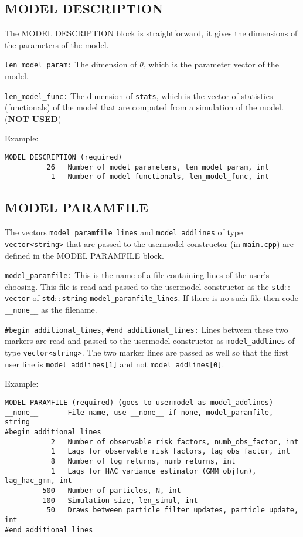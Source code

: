 \documentclass[11pt, letterpaper, notitlepage]{article}
\begin{document}
\subsection{MODEL DESCRIPTION}

The MODEL DESCRIPTION block is straightforward, it gives the dimensions of the parameters of the model.

\texttt{len\_model\_param:} The dimension of $\theta$, which is the parameter vector of the model.

\texttt{len\_model\_func:} The dimension of \texttt{stats}, which is the vector of statistics (functionals) of the model that are computed from a simulation of the model. (\textbf{NOT USED})

Example:

\begin{verbatim}
MODEL DESCRIPTION (required)
          26   Number of model parameters, len_model_param, int
           1   Number of model functionals, len_model_func, int
\end{verbatim}


\subsection{MODEL PARAMFILE}

The vectors \texttt{model\_paramfile\_lines} and \texttt{model\_addlines} of type \texttt{vector<string>} that are passed to the usermodel constructor (in \texttt{main.cpp}) are defined in the MODEL PARAMFILE block.

\texttt{model\_paramfile:} This is the name of a file containing lines of the user’s choosing. This file is read and passed to the usermodel constructor as the \texttt{std$::$vector} of \texttt{std$::$string} \texttt{model\_paramfile\_lines}. If there is no such file then code \texttt{\_\_none\_\_} as the filename.

\texttt{\#begin additional\_lines}, \texttt{\#end additional\_lines:} Lines between these two markers are read and passed to the usermodel constructor as \texttt{model\_addlines} of type \texttt{vector<string>}. The two marker lines are passed as well so that the first user line is \texttt{model\_addlines[1]} and not \texttt{model\_addlines[0]}.

Example:

\begin{verbatim}
MODEL PARAMFILE (required) (goes to usermodel as model_addlines)
__none__       File name, use __none__ if none, model_paramfile, string
#begin additional lines
           2   Number of observable risk factors, numb_obs_factor, int
           1   Lags for observable risk factors, lag_obs_factor, int
           8   Number of log returns, numb_returns, int
           1   Lags for HAC variance estimator (GMM objfun), lag_hac_gmm, int
         500   Number of particles, N, int
         100   Simulation size, len_simul, int
          50   Draws between particle filter updates, particle_update, int
#end additional lines
\end{verbatim}
\end{document}
